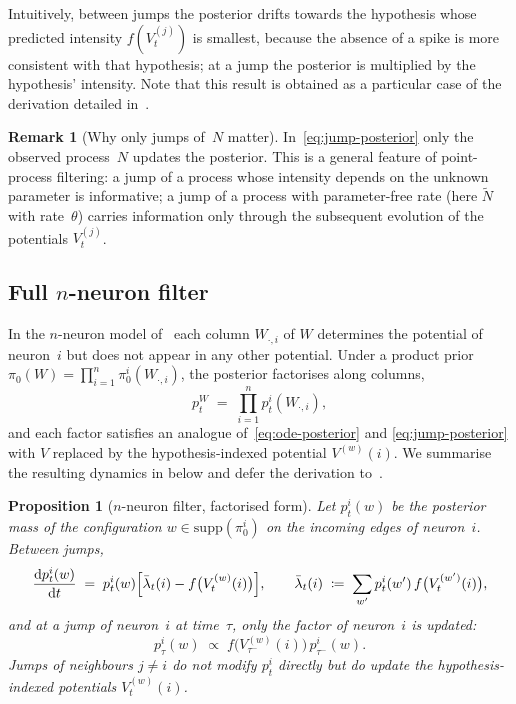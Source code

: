 \documentclass[11pt,a4paper]{article}
\newtheorem{proposition}[theorem]{Proposition}
\theoremstyle{definition}
\newtheorem{remark}[theorem]{Remark}
\begin{document}
Intuitively, between jumps the
posterior drifts towards the hypothesis whose predicted intensity
$f(V_t^{(j)})$ is smallest, because the absence of a spike is more
consistent with that hypothesis; at a jump the posterior is multiplied by the hypothesis' intensity. Note that this result is obtained as a particular case of the derivation detailed in~.

\begin{remark}[Why only jumps of~$N$ matter]
In~\eqref{eq:jump-posterior} only the observed process~$N$ updates the
posterior. This is a general feature of point-process filtering: a
jump of a process whose intensity depends on the unknown parameter is
informative; a jump of a process with parameter-free rate (here
$\widetilde N$ with rate~$\theta$) carries information only through the
subsequent evolution of the potentials $V_t^{(j)}$.
\end{remark}

\subsection{Full $n$-neuron filter}
\label{subsec:nneuron-filter}

In the $n$-neuron model of~ each column $W_{\cdot, i}$
of $W$ determines the potential of neuron~$i$ but does not appear in
any other potential. Under a product prior
$\pi_0(W) = \prod_{i=1}^n \pi_0^i(W_{\cdot, i})$, the posterior
factorises along columns,
\begin{equation}
    p_t^W \;=\; \prod_{i=1}^n p_t^i(W_{\cdot, i}),
    \label{eq:factorisation}
\end{equation}
and each factor satisfies an analogue of~\eqref{eq:ode-posterior} and
\eqref{eq:jump-posterior} with $V$ replaced by the hypothesis-indexed
potential $V^{(w)}(i)$. We summarise the resulting dynamics in
 below and defer the derivation
to~.

\begin{proposition}[$n$-neuron filter, factorised form]
\label{prop:filter-n}
Let $p_t^i(w)$ be the posterior mass of the configuration
$w \in \mathrm{supp}(\pi_0^i)$ on the incoming edges of neuron~$i$.
Between jumps,
\begin{equation}
    \frac{\mathrm{d} p_t^i(w)}{\mathrm{d} t} \;=\; p_t^i(w) \Bigl[
        \bar \lambda_t(i) - f\bigl( V_t^{(w)}(i) \bigr) \Bigr],
    \qquad
    \bar \lambda_t(i) \;\coloneqq\; \sum_{w'} p_t^i(w') \,
        f\bigl( V_t^{(w')}(i) \bigr),
    \label{eq:ode-n}
\end{equation}
and at a jump of neuron~$i$ at time~$\tau$, only the factor of
neuron~$i$ is updated:
\begin{equation}
    p_\tau^i(w) \;\propto\; f\bigl( V_{\tau^-}^{(w)}(i) \bigr)
        \, p_{\tau^-}^i(w).
    \label{eq:jump-n}
\end{equation}
Jumps of neighbours $j \neq i$ do not modify $p_t^i$ directly but do
update the hypothesis-indexed potentials $V_t^{(w)}(i)$.
\end{proposition}
\end{document}
